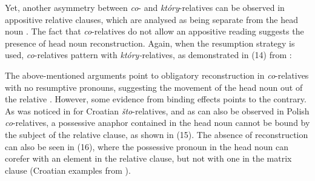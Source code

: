\documentclass[output=paper]{langsci/langscibook}
\begin{document}
Yet, another asymmetry between \textit{co}{}- and \textit{który}{}-relatives can be observed in appositive relative clauses, which are analysed as being separate from the head noun \citep{Chierchia1990}. The fact that \textit{co}{}-relatives do not allow an appositive reading suggests the presence of head noun reconstruction. Again, when the resumption strategy is used, \textit{co}{}-relatives pattern with \textit{który-}relatives, as demonstrated in (14) from \citet[378]{Szczegielniak2006}:

\ea%
    \label{ex:leska:14}
    \z
\z

The above-mentioned arguments point to obligatory reconstruction in \textit{co}{}-relatives with no resumptive pronouns, suggesting the movement of the head noun out of the relative \citep{Åfarli1994,Bhatt2002,Bianchi1999,Brame1968,Vries2002,Hornstein2000,Kayne1994,Safir1999,Schachter1973,Vergnaud1974,Zwart2000}. However, some evidence from binding effects points to the contrary. As was noticed in \citet{Gračanin-Yuksek2013} for Croatian \textit{što}{}-relatives, and as can also be observed in Polish \textit{co}{}-relatives, a possessive anaphor contained in the head noun cannot be bound by the subject of the relative clause, as shown in (15). The absence of reconstruction can also be seen in (16), where the possessive pronoun in the head noun can corefer with an element in the relative clause, but not with one in the matrix clause (Croatian examples from \citealt{Gračanin-Yuksek2013}).
\end{document}
